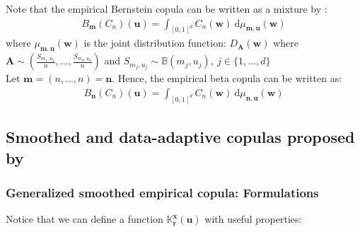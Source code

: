 \documentclass[12pt]{report}
\newcommand{\1}{\mathbf{1}}
\begin{document}
Note that the empirical Bernstein copula can be written as a mixture by \cite{SegersEBC}: 
\begin{align*}
B_{\boldsymbol{m}}(C_{n})(\boldsymbol{u}) = \int_{[0,1]^d} C_{n}(\boldsymbol{w})  \: \mathrm{d}\mu_{\boldsymbol{m},\boldsymbol{u}}(\boldsymbol{w})  
\end{align*}
where $\mu_{\boldsymbol{m},\boldsymbol{u}}(\boldsymbol{w})$ is the joint distribution function: $D_{\boldsymbol{A}}(\boldsymbol{w})$ where $\boldsymbol{A} \sim \left(\frac{S_{m_{1},u_{1}}}{n}, \dots, \frac{S_{m_{d},u_{d}}}{n}\right)$ and $S_{m_{j},u_{j}} \sim \mathbb{B}(m_{j},u_{j}), \: j \in \{1, \dots, d \}$ \\
\vspace{0.5cm}
Let $\boldsymbol{m} = (n, \dots, n) = \boldsymbol{n}$. Hence, the empirical beta copula can be written as:
\begin{align*}
B_{\boldsymbol{n}}(C_{n})(\boldsymbol{u}) = \int_{[0,1]^d} C_{n}(\boldsymbol{w})  \: \mathrm{d}\mu_{\boldsymbol{n},\boldsymbol{u}}(\boldsymbol{w})  
\end{align*}
\subsection{Smoothed and data-adaptive copulas proposed by \cite{KojadinovicYi2024Smooth}}
\subsubsection{Generalized smoothed empirical copula: Formulations}
\vspace{0.5cm}
Notice that we can define a function $\mathds{K}_{\boldsymbol{r}}^{\boldsymbol{x}}(\boldsymbol{u})$ with useful properties:
\end{document}
